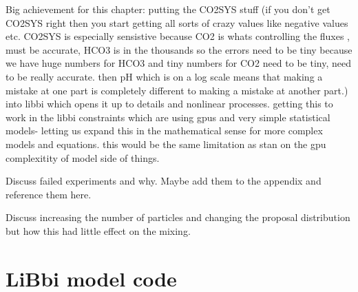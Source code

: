 \documentclass{ruthesis}
\begin{document}
Big achievement for this chapter: putting the CO2SYS stuff (if you don't get CO2SYS right then you start getting all sorts of crazy values like negative values etc. CO2SYS is especially sensistive because CO2 is whats controlling the fluxes , must be accurate, HCO3 is in the thousands so the errors need to be tiny because we have huge numbers for HCO3 and tiny numbers for CO2 need to be tiny, need to be really accurate. then pH which is on a log scale means that making a mistake at one part is completely different to making a mistake at another part.) into libbi which opens it up to details and nonlinear processes. getting this to work in the libbi constraints which are using gpus and very simple statistical models- letting us expand this in the mathematical sense for more complex models and equations. this would be the same limitation as stan on the gpu complexitity of model side of things.

Discuss failed experiments and why. Maybe add them to the appendix and reference them here.

Discuss increasing the number of particles and changing the proposal distribution but how this had little effect on the mixing.


\appendix

\chapter{LiBbi model code}\label{appendix_micro_libbi_code}
\end{document}
